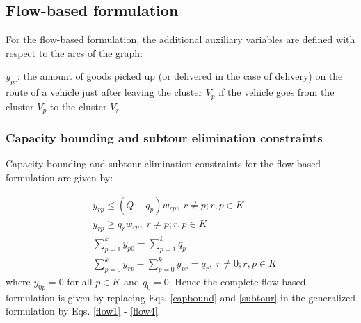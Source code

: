 \documentclass[letterpaper,12pt,onehalfspacing,twoside]{article}
\theoremstyle{msds}
\begin{document}
\subsection{Flow-based formulation}
For the flow-based formulation, the additional auxiliary variables are defined with respect to the arcs of the graph:

$y_{pr}$: the amount of goods picked up (or delivered in the case of delivery) on the route of a vehicle just after leaving the cluster $V_p$ if the vehicle goes from the cluster $V_p$ to the cluster $V_r$

\subsubsection{Capacity bounding and subtour elimination constraints}
Capacity bounding and subtour elimination constraints for the flow-based formulation are given by:

\begin{align}
&y_{rp} \le (Q - q_p) w_{rp}, \; r \ne p; r,p \in K \label{flow1} \\
&y_{rp} \ge q_r w_{rp}, \;  r \ne p; r, p \in K \label{flow2}\\
&\sum_{p=1}^k y_{p0} =  \sum_{p=1}^k q_p \label{flow3} \\
&\sum_{p=0}^k y_{rp} - \sum_{p=0}^k y_{pr} = q_r, \; r \ne 0; r,p \in K \label{flow4}
\end{align}
where $y_{0p} = 0$ for all $p \in K$ and $q_0 = 0$.
Hence the complete flow based formulation is given by replacing Eqs. \eqref{capbound} and \eqref{subtour} in the generalized formulation by  Eqs. \eqref{flow1} - \eqref{flow4}.
\end{document}

